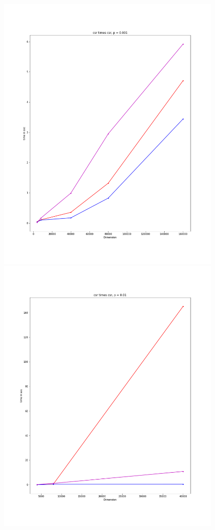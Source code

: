 \documentclass[12pt]{article}
\begin{document}
\begin{figure}[h]
  \includegraphics[scale = 0.16]{csr_csr_001.PNG}
  \includegraphics[scale = 0.16]{csr_csr_01.PNG}

\end{figure}
\end{document}
